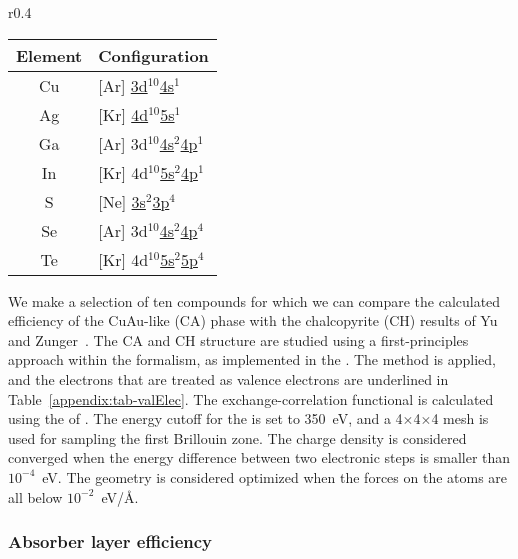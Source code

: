 \begin{refsection}
\begin{wraptable}[13]{r}{0.4\textwidth} \vspace{-2.5em}
\centering 
\renewcommand{\arraystretch}{1.2} 
\captionsetup{width=0.36\textwidth}
\caption{Electron configuration of the atoms.} 
\label{appendix:tab-valElec}
\begin{tabular}{c@{\hskip 1 em}l}\hline 
Element & Configuration \\\hline 
Cu & [Ar] \underline{3d$^{10}$4s$^1$} \\ 
Ag & [Kr] \underline{4d$^{10}$5s$^1$} \\ 
Ga & [Ar] 3d$^{10}$\underline{4s$^2$4p$^1$}\\ 
In & [Kr] 4d$^{10}$\underline{5s$^{2}$4p$^1$} \\ 
S  & [Ne] \underline{3s$^2$3p$^4$} \\ 
Se & [Ar] 3d$^{10}$\underline{4s$^{2}$4p$^4$} \\ 
Te & [Kr] 4d$^{10}$\underline{5s$^2$5p$^4$}\\ 
\hline 
\end{tabular} 
\end{wraptable} 
We make a selection of ten compounds for which we can compare the calculated 
efficiency of the CuAu-like (CA) phase with the chalcopyrite (CH) results of 
Yu and Zunger~\cite{Yu2012}. The CA and CH structure are studied using a 
first-principles approach within the  formalism, as implemented in 
the . The  method is applied, and the electrons that 
are treated as valence electrons are underlined in 
Table~\ref{appendix:tab-valElec}. The exchange-correlation functional is 
calculated using the  of . The energy cutoff for the 
 is set to 350~\si{\electronvolt}, and a 
4$\times$4$\times$4  mesh is used for sampling the first Brillouin 
zone. The charge density is considered converged when the energy difference 
between two electronic steps is smaller than $10^{-4}$~\si{\electronvolt}. 
The geometry is considered optimized when the forces on the atoms are all 
below $10^{-2}$~\si{\electronvolt}/\si{\angstrom}.

 \label{appendix:sec-solar_efficiency}
\subsubsection{Absorber layer efficiency} 


\end{refsection}
